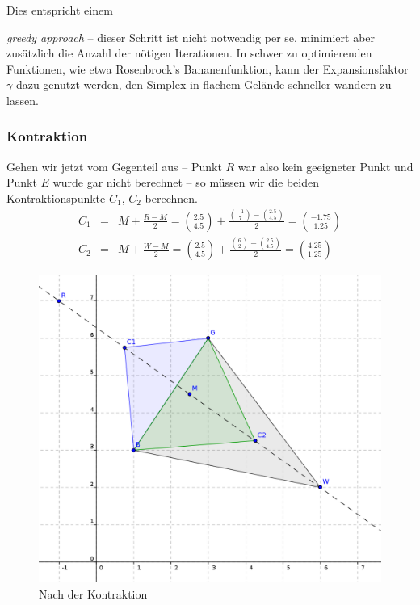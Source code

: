 \documentclass[naustrian]{article}
\begin{document}
Dies entspricht einem {\emph{greedy approach} -- dieser
Schritt ist nicht notwendig per se, minimiert aber zusätzlich die Anzahl
der nötigen Iterationen. In schwer zu optimierenden Funktionen, wie etwa
Rosenbrock's Bananenfunktion, kann der Expansionsfaktor $\gamma$ dazu genutzt werden,
den Simplex in flachem Gelände schneller wandern zu lassen.

\subsubsection{Kontraktion}

Gehen wir jetzt vom Gegenteil aus -- Punkt $R$ war also
kein geeigneter Punkt und Punkt $E$ wurde gar nicht berechnet --
so müssen wir die beiden Kontraktionspunkte $C_{1}$, $C_{2}$ berechnen.
\begin{eqnarray*}
    C_{1} & = & M+\frac{R-M}{2}=\binom{2.5}{4.5}+\frac{\binom{-1}{7}-\binom{2.5}{4.5}}{2}=\binom{-1.75}{1.25}\\
    C_{2} & = & M+\frac{W-M}{2}=\binom{2.5}{4.5}+\frac{\binom{6}{2}-\binom{2.5}{4.5}}{2}=\binom{4.25}{1.25}
\end{eqnarray*}

\begin{figure}[H]
    \centering
    \includegraphics[widht=.65\textwidth]{nelder_mead/triangle_contract}
    \caption{Nach der Kontraktion}
\end{figure}

}
\end{document}

